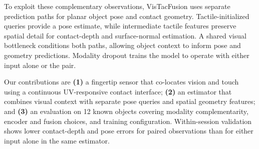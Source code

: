\documentclass[letterpaper,10pt,conference]{ieeeconf}
\newcommand{\method}{VisTacFusion}
\begin{document}
To exploit these complementary observations, \method{} uses separate prediction paths for planar object pose and contact geometry. Tactile-initialized queries provide a pose estimate, while intermediate tactile features preserve spatial detail for contact-depth and surface-normal estimation. A shared visual bottleneck conditions both paths, allowing object context to inform pose and geometry predictions. Modality dropout trains the model to operate with either input alone or the pair.

Our contributions are \textbf{(1)} a fingertip sensor that co-locates vision and touch using a continuous UV-responsive contact interface; \textbf{(2)} an estimator that combines visual context with separate pose queries and spatial geometry features; and \textbf{(3)} an evaluation on 12 known objects covering modality complementarity, encoder and fusion choices, and training configuration. Within-session validation shows lower contact-depth and pose errors for paired observations than for either input alone in the same estimator.\unskip



\end{document}
